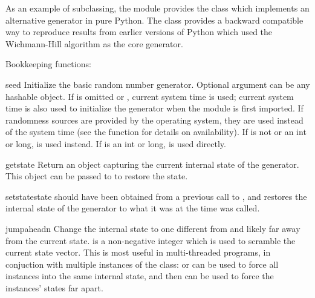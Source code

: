 As an example of subclassing, the  module provides
the  class which implements an alternative generator
in pure Python.  The class provides a backward compatible way to
reproduce results from earlier versions of Python which used the
Wichmann-Hill algorithm as the core generator.


Bookkeeping functions:

\begin{funcdesc}{seed}{}
  Initialize the basic random number generator.
  Optional argument  can be any hashable object.
  If  is omitted or , current system time is used;
  current system time is also used to initialize the generator when the
  module is first imported.  If randomness sources are provided by the
  operating system, they are used instead of the system time (see the
  function for details on availability).  
  If  is not  or an int or long,
   is used instead.
  If  is an int or long,  is used directly.
\end{funcdesc}

\begin{funcdesc}{getstate}{}
  Return an object capturing the current internal state of the
  generator.  This object can be passed to  to
  restore the state.
\end{funcdesc}

\begin{funcdesc}{setstate}{state}
   should have been obtained from a previous call to
  , and  restores the
  internal state of the generator to what it was at the time
   was called.
\end{funcdesc}

\begin{funcdesc}{jumpahead}{n}
  Change the internal state to one different from and likely far away from
  the current state.   is a non-negative integer which is used to
  scramble the current state vector.  This is most useful in multi-threaded
  programs, in conjuction with multiple instances of the 
  class:  or  can be used to force all
  instances into the same internal state, and then 
  can be used to force the instances' states far apart.
 \end{funcdesc}

